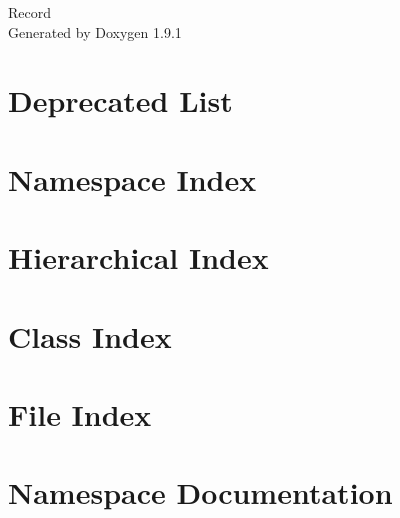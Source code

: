 \let\mypdfximage\pdfximage\def\pdfximage{\immediate\mypdfximage}\documentclass[twoside]{book}
\newcommand{\+}{\discretionary{\mbox{\scriptsize$\hookleftarrow$}}{}{}}
\newcommand{\clearemptydoublepage}{%
  \newpage{\pagestyle{empty}\cleardoublepage}%
}
\begin{document}
\raggedbottom

\hypersetup{pageanchor=false,
             bookmarksnumbered=true,
             pdfencoding=unicode
            }
\begin{titlepage}
\vspace*{7cm}
\begin{center}%
{\Large Record }\\
\vspace*{1cm}
{\large Generated by Doxygen 1.9.1}\\
\end{center}
\end{titlepage}
\clearemptydoublepage
{}
\tableofcontents
\clearemptydoublepage
{}
\hypersetup{pageanchor=true}

\chapter{Deprecated List}
\label{deprecated}

\chapter{Namespace Index}

\chapter{Hierarchical Index}

\chapter{Class Index}

\chapter{File Index}

\chapter{Namespace Documentation}

















\end{document}
